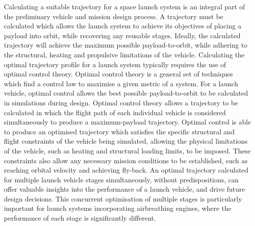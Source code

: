   Calculating a suitable trajectory for a space launch system is an integral part of the preliminary vehicle and mission design process. 
  A trajectory must be calculated which allows the launch system to achieve its objectives of placing a payload into orbit, while recovering any reusable stages.
  Ideally, the calculated trajectory will achieve the maximum possible payload-to-orbit, while adhering to the structural, heating and propulsive limitations of the vehicle.  
  Calculating the optimal trajectory profile for a launch system typically requires the use of optimal control theory. 
    Optimal control theory is a general set of techniques which find a control law to maximise a given metric of a system\cite{Rao2009,Betts1998}. For a launch vehicle, optimal control allows the best possible payload-to-orbit to be calculated in simulations during design.
  Optimal control theory allows a trajectory to be calculated in which the flight path of each individual vehicle is considered simultaneously to produce a maximum-payload trajectory\cite{Betts1998}. 
  Optimal control is able to produce an optimised trajectory which satisfies the specific structural and flight constraints of the vehicle being simulated, allowing the physical limitations of the vehicle, such as heating and structural loading limits, to be imposed\cite{Betts1998}. These constraints also allow any necessary mission conditions to be established, such as reaching orbital velocity and achieving fly-back. 
  An optimal trajectory calculated for multiple launch vehicle stages simultaneously, without predispositions, can offer valuable insights into the performance of a launch vehicle, and drive future design decisions. 
  This concurrent optimisation of multiple stages is particularly important for launch systems incorporating airbreathing engines, where the performance of each stage is significantly different.  
  



  
  
